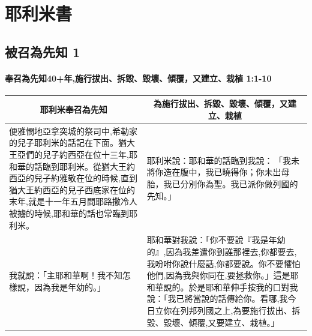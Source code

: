 \chapter{耶利米書}






\section{被召為先知 1}
\subsubsection{奉召為先知40+年,施行拔出、拆毀、毀壞、傾覆，又建立、栽植 1:1-10}
\begin{table}[H]
\centering
\begin{tabular}{p{9cm}|p{8.40cm}}\hline\hline
\multicolumn{1}{c|}{耶利米奉召為先知}&\multicolumn{1}{c}{為施行拔出、拆毀、毀壞、傾覆，又建立、栽植}\\\hline
便雅憫地亞拿突城的祭司中,希勒家的兒子耶利米的話記在下面。猶大王亞們的兒子約西亞在位十三年,耶和華的話臨到耶利米。從猶大王約西亞的兒子約雅敬在位的時候,直到猶大王約西亞的兒子西底家在位的末年,就是十一年五月間耶路撒冷人被擄的時候,耶和華的話也常臨到耶利米。
&耶利米說：耶和華的話臨到我說： 「我未將你造在腹中，我已曉得你；你未出母胎，我已分別你為聖。我已派你做列國的先知。」 \\\hline
我就說：「主耶和華啊！我不知怎樣說，因為我是年幼的。」 
&耶和華對我說：「你不要說『我是年幼的』,因為我差遣你到誰那裡去,你都要去,我吩咐你說什麼話,你都要說。你不要懼怕他們,因為我與你同在,要拯救你。」這是耶和華說的。於是耶和華伸手按我的口對我說：「我已將當說的話傳給你。看哪,我今日立你在列邦列國之上,為要施行拔出、拆毀、毀壞、傾覆,又要建立、栽植。」
\\\hline
\end{tabular}
\end{table}


